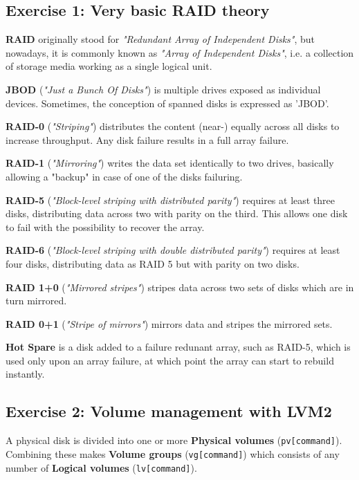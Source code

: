 
\subsection{Exercise 1: Very basic RAID theory}
\textbf{RAID} originally stood for \emph{"Redundant Array of Independent Disks"}, but
nowadays, it is commonly known as \emph{"Array of Independent Disks"}, i.e. a
collection of storage media working as a single logical unit.

\textbf{JBOD} (\emph{"Just a Bunch Of Disks"}) is multiple drives exposed as individual
devices. Sometimes, the conception of spanned disks is expressed as 'JBOD'.

\textbf{RAID-0} (\emph{"Striping"}) distributes the content (near-) equally across all disks to increase throughput. Any disk failure results in a full array failure.

\textbf{RAID-1} (\emph{"Mirroring"}) writes the data set identically to two drives, basically allowing a "backup" in case of one of the disks failuring.

\textbf{RAID-5} (\emph{"Block-level striping with distributed parity"}) requires at least three disks, distributing data across two with parity on the third. This allows one disk to fail with the possibility to recover the array.

\textbf{RAID-6} (\emph{"Block-level striping with double distributed parity"}) requires at least four disks, distributing data as RAID 5 but with parity on two disks.

\textbf{RAID 1+0} (\emph{"Mirrored stripes"}) stripes data across two sets of disks which are in turn mirrored.

\textbf{RAID 0+1} (\emph{"Stripe of mirrors"}) mirrors data and stripes the mirrored sets.

\textbf{Hot Spare} is a disk added to a failure redunant array, such as RAID-5, which is used only upon an array failure, at which point the array can start to rebuild instantly.

\subsection{Exercise 2: Volume management with LVM2}

A physical disk is divided into one or more \textbf{Physical volumes} (\verb=pv[command]=). Combining these makes  \textbf{Volume groups} (\verb=vg[command]=) which consists of any number of \textbf{Logical volumes} (\verb=lv[command]=).

